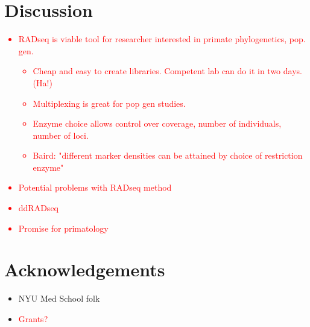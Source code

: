 \documentclass[12pt]{article}
\begin{document}
%
%

\section{Discussion}
\textcolor{red}{
\begin{itemize}
	\item RADseq is viable tool for researcher interested in primate phylogenetics, pop. gen.
	\begin{itemize}
		\item Cheap and easy to create libraries. Competent lab can do it in two days. (Ha!)
		\item Multiplexing is great for pop gen studies.
		\item Enzyme choice allows control over coverage, number of individuals, number of loci.
		\item Baird: "different marker densities can be attained by choice of restriction enzyme"
	\end{itemize}
	\item Potential problems with RADseq method
	\item ddRADseq
	\item Promise for primatology
\end{itemize}
}

\section{Acknowledgements}
\begin{itemize}
	\item NYU Med School folk
	\item \textcolor{red}{Grants?}
\end{itemize}
\end{document}
